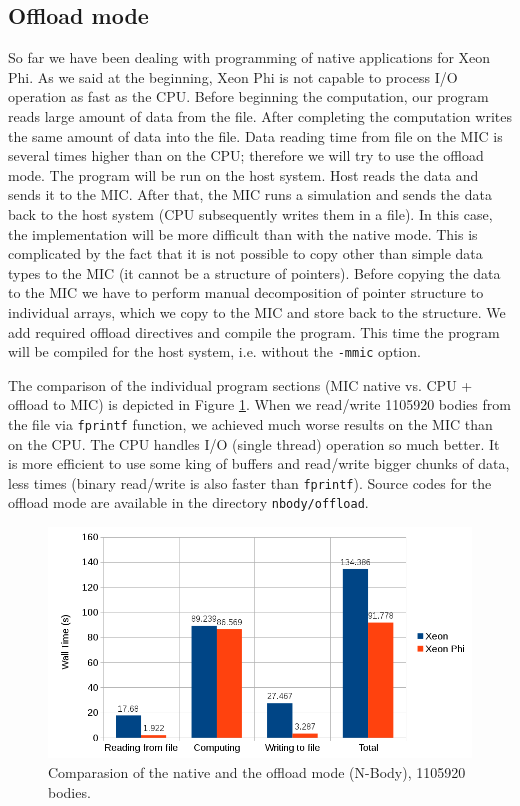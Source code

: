 \subsection{Offload mode}
So far we have been dealing with programming of native applications for Xeon Phi. As we said at the beginning, Xeon Phi is not capable to process I/O operation as fast as the CPU. Before beginning the computation, our program reads large amount of data from the file. After completing the computation writes the same amount of data into the file. Data reading time from file on the MIC is several times higher than on the CPU; therefore we will try to use the offload mode. The program will be run on the host system. Host reads the data and sends it to the MIC. After that, the MIC runs a simulation and sends the data back to the host system (CPU subsequently writes them in a file). In this case, the implementation will be more difficult than with the native mode. This is complicated by the fact that it is not possible to copy other than simple data types to the MIC (it cannot be a structure of pointers). Before copying the data to the MIC we have to perform manual decomposition of pointer structure to individual arrays, which we copy to the MIC and store back to the structure. We add required offload directives and compile the program. This time the program will be compiled for the host system, i.e. without the \texttt{-mmic} option. 

\par The comparison of the individual program sections (MIC native vs. CPU + offload to MIC) is depicted in Figure \ref{fig:graph_nbody_offload_vs_native}. When we read/write 1105920 bodies from the file via \texttt{fprintf} function, we achieved much worse results on the MIC than on the CPU. The CPU handles I/O (single thread) operation so much better. It is more efficient to use some king of buffers and read/write bigger chunks of data, less times (binary read/write is also faster than \texttt{fprintf}). Source codes for the offload mode are available in the directory \texttt{nbody/offload}.

\begin{figure}[htbp]
    \centering
    \includegraphics[width=1\linewidth]{fig/nbody_offload_vs_native.png}
    \caption{Comparasion of the native and the offload mode (N-Body), 1105920 bodies.}
    \label{fig:graph_nbody_offload_vs_native}
\end{figure} 

